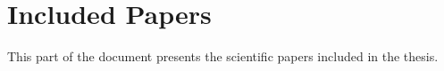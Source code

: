 \part{Included Papers}
This part of the document presents the scientific papers included in the thesis.